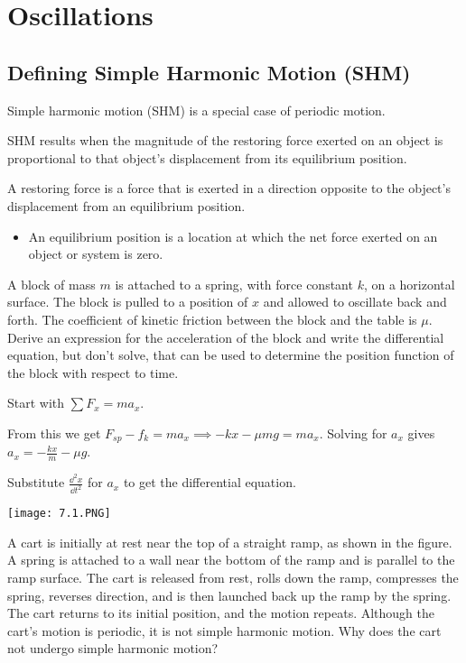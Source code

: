 \documentclass[../mech.tex]{subfiles}
\begin{document}
\chapter{Oscillations}
\section{Defining Simple Harmonic Motion (SHM)}
Simple harmonic motion (SHM) is a special case of periodic motion.

SHM results when the magnitude of the restoring force exerted on an object is proportional to that object's displacement from its equilibrium position.

A restoring force is a force that is exerted in a direction opposite to the object's displacement from an equilibrium position.
\begin{itemize}
    \item An equilibrium position is a location at which the net force exerted on an object or system is zero.
\end{itemize}

\begin{example}
    A block of mass $m$ is attached to a spring, with force constant $k$, on a horizontal surface. The block is pulled to a position of $x$ and allowed to oscillate back and forth.
    The coefficient of kinetic friction between the block and the table is $\mu$. Derive an expression for the acceleration of the block and write the differential equation, but don't solve, that can be used to determine the position 
    function of the block with respect to time.

    Start with $\sum F_x = ma_x$.

    From this we get $F_{sp}-f_k = ma_x \implies -kx -\mu mg = ma_x$. Solving for $a_x$ gives $a_x = -\frac{kx}{m}-\mu g$.

    Substitute $\frac{\dd^2 x}{\dd t^2}$ for $a_x$ to get the differential equation.
\end{example}

\ex \begin{center}
    \texttt{[image: 7.1.PNG]}
\end{center}
A cart is initially at rest near the top of a straight ramp, as shown in the figure. A spring is attached to a wall near the bottom of the ramp and is parallel to the ramp surface. The cart is released from rest, rolls down the ramp, compresses the spring, 
reverses direction, and is then launched back up the ramp by the spring. The cart returns to its initial position, and the motion repeats. Although the cart's motion is periodic, it is not simple harmonic motion. Why does the cart not undergo simple harmonic motion?
\end{document}
